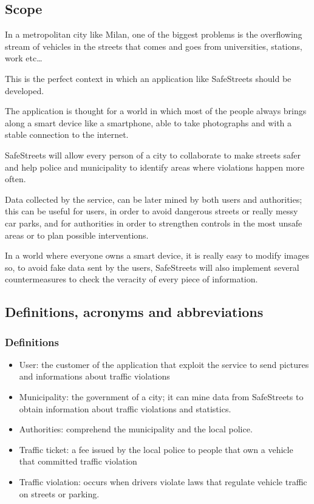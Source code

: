 \subsection{Scope}
In a metropolitan city like Milan, one of the biggest problems is the overflowing stream of vehicles in the streets that comes and goes from universities, stations, work etc…  \newline\par
This is the perfect context in which an application like SafeStreets should be developed.  \newline\par
The application is thought for a world in which most of the people always brings along a smart device like a smartphone, able to take photographs and with a stable connection to the internet.  \newline\par
SafeStreets will allow every person of a city to collaborate to make streets safer and help police and municipality to identify areas where violations happen more often.  \newline\par
Data collected by the service, can be later mined by both users and authorities; this can be useful for users, in order to avoid dangerous streets or really messy car parks, and for authorities in order to strengthen controls in the most unsafe areas or to plan possible interventions.  \newline\par
In a world where everyone owns a smart device, it is really easy to modify images so, to avoid fake data sent by the users, SafeStreets will also implement several countermeasures to check the veracity of every piece of information. 
\subsection{Definitions, acronyms and abbreviations }
\subsubsection{Definitions}
\begin{itemize}
	\item User: the customer of the application that exploit the service to send pictures and informations about traffic violations 
	\item Municipality: the government of a city; it can mine data from SafeStreets to obtain information about traffic violations and statistics.
	\item Authorities: comprehend the municipality and the local police. 
	\item Traffic ticket: a fee issued by the local police to people that own a vehicle that committed traffic violation 
	\item Traffic violation: occurs when drivers violate laws that regulate vehicle traffic on streets or parking. 
\end{itemize}
